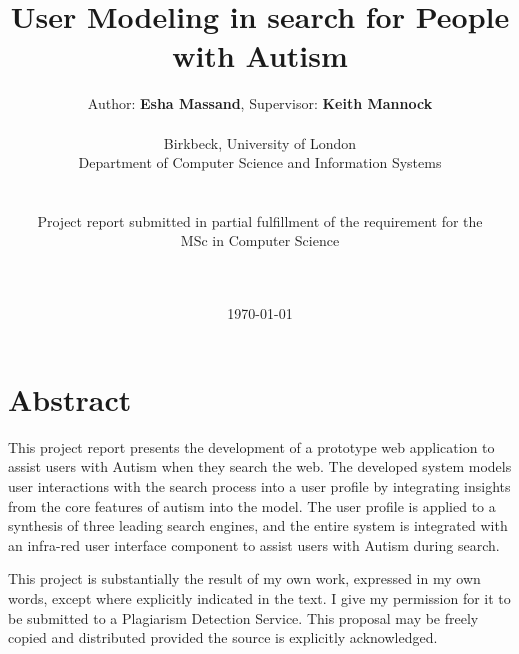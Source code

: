 \documentclass[a4paper, 11pt]{article}
\begin{document}
\LARGE\title{User Modeling in search for People with Autism}

\LARGE\author{Author: \textbf{Esha Massand}, Supervisor: \textbf{Keith Mannock}\\
\\
Birkbeck, University of London\\Department of Computer Science and Information Systems\\\\\\Project report submitted in partial fulfillment of the requirement for the \\MSc in Computer Science\date{\mydate\today}
\\\
}

\normalsize


\maketitle


\section*{Abstract}
\begin{justify}
This project report presents the development of a prototype web application to assist users with Autism when they search the web. The developed system models user interactions with the search process into a user profile by integrating insights from the core features of autism into the model. The user profile is applied to a synthesis of three leading search engines, and the entire system is integrated with an infra-red user interface component to assist users with Autism during search.\\
\end{justify}


\begin{justify}
This project is substantially the result of my own work, expressed in my own words, except where explicitly indicated in the text. I give my permission for it to be submitted to a Plagiarism Detection Service. This proposal may be freely copied and distributed provided the source is explicitly acknowledged.
\end{justify}

\begin{verbatim}














\end{verbatim}
\end{document}
